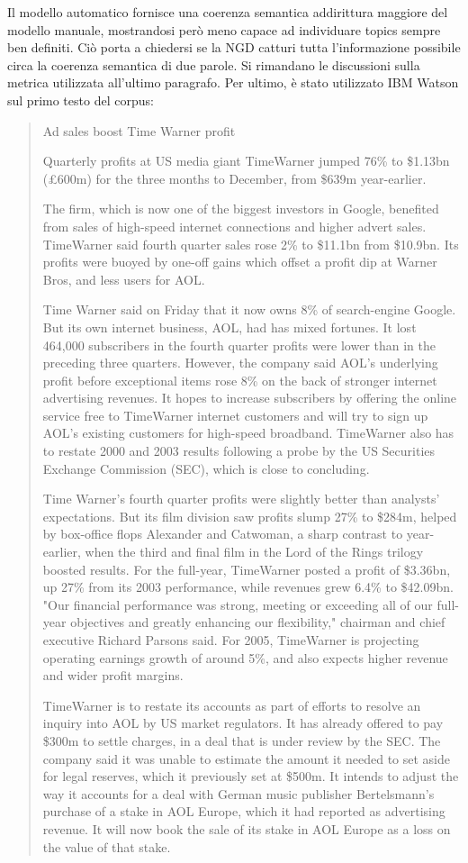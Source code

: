 \documentclass[]{article}
\begin{document}
\newline
Il modello automatico fornisce una coerenza semantica addirittura maggiore del modello manuale, mostrandosi però meno capace ad individuare topics sempre ben definiti. Ciò porta a chiedersi se la NGD catturi tutta l'informazione possibile circa la coerenza semantica di due parole. Si rimandano le discussioni sulla metrica utilizzata all'ultimo paragrafo.
\newline
Per ultimo, è stato utilizzato IBM Watson sul primo testo del corpus:
{\footnotesize \blockquote{Ad sales boost Time Warner profit
	
	Quarterly profits at US media giant TimeWarner jumped 76\% to \$1.13bn (£600m) for the three months to December, from \$639m year-earlier.
	
	The firm, which is now one of the biggest investors in Google, benefited from sales of high-speed internet connections and higher advert sales. TimeWarner said fourth quarter sales rose 2\% to \$11.1bn from \$10.9bn. Its profits were buoyed by one-off gains which offset a profit dip at Warner Bros, and less users for AOL.
	
	Time Warner said on Friday that it now owns 8\% of search-engine Google. But its own internet business, AOL, had has mixed fortunes. It lost 464,000 subscribers in the fourth quarter profits were lower than in the preceding three quarters. However, the company said AOL's underlying profit before exceptional items rose 8\% on the back of stronger internet advertising revenues. It hopes to increase subscribers by offering the online service free to TimeWarner internet customers and will try to sign up AOL's existing customers for high-speed broadband. TimeWarner also has to restate 2000 and 2003 results following a probe by the US Securities Exchange Commission (SEC), which is close to concluding.
	
	Time Warner's fourth quarter profits were slightly better than analysts' expectations. But its film division saw profits slump 27\% to \$284m, helped by box-office flops Alexander and Catwoman, a sharp contrast to year-earlier, when the third and final film in the Lord of the Rings trilogy boosted results. For the full-year, TimeWarner posted a profit of \$3.36bn, up 27\% from its 2003 performance, while revenues grew 6.4\% to \$42.09bn. "Our financial performance was strong, meeting or exceeding all of our full-year objectives and greatly enhancing our flexibility," chairman and chief executive Richard Parsons said. For 2005, TimeWarner is projecting operating earnings growth of around 5\%, and also expects higher revenue and wider profit margins.
	
	TimeWarner is to restate its accounts as part of efforts to resolve an inquiry into AOL by US market regulators. It has already offered to pay \$300m to settle charges, in a deal that is under review by the SEC. The company said it was unable to estimate the amount it needed to set aside for legal reserves, which it previously set at \$500m. It intends to adjust the way it accounts for a deal with German music publisher Bertelsmann's purchase of a stake in AOL Europe, which it had reported as advertising revenue. It will now book the sale of its stake in AOL Europe as a loss on the value of that stake.
}}
\end{document}
